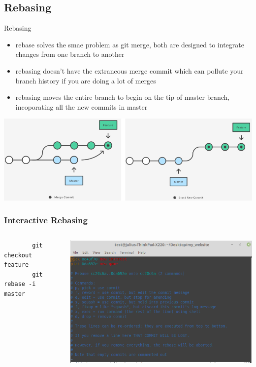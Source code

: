 \documentclass[12pt]{beamer}
\begin{document}
\subsection{Rebasing}
\begin{frame}{Rebasing}
\begin{itemize}
	\item rebase solves the smae problem as git merge, both are designed to integrate changes from one branch to another
	\item rebasing doesn't have the extraneous merge commit which can pollute your branch history if you are doing a lot of merges
	\item rebasing moves the entire branch to begin on the tip of master branch, incoporating all the new commits in master
\end{itemize}
\begin{center}
	\includegraphics[width=\linewidth]{merge_vs_rebase}
\end{center}
\end{frame}

\begin{frame}[fragile]
\frametitle{Interactive Rebasing}
\begin{columns}
	\begin{column}{0.5\linewidth}
		\begin{verbatim}
		git checkout feature
		git rebase -i master
		\end{verbatim}		
	\end{column}
	\begin{column}{0.5\linewidth}
		\includegraphics[width=1\linewidth]{rebase_i}
	\end{column}
\end{columns}
\end{frame}
\end{document}
